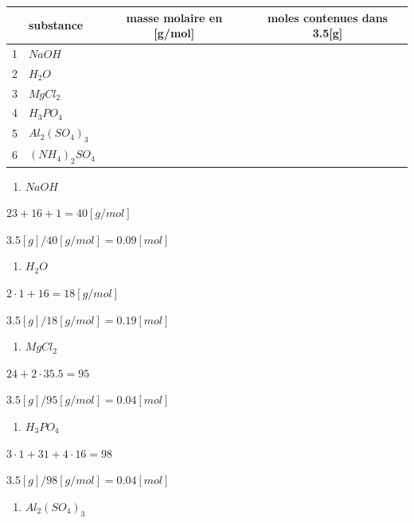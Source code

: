 \documentclass[
  11pt,
  french,
  a4paper,
  openany]{book}
\providecommand{\tightlist}{%
  \setlength{\itemsep}{0pt}\setlength{\parskip}{0pt}}
\begin{document}
\begin{longtable}[]{@{}clcc@{}}
\toprule
& substance & masse molaire en {[}g/mol{]} & moles contenues dans 3.5{[}g{]}\tabularnewline
\midrule
\endhead
1 & \(NaOH\) & &\tabularnewline
2 & \(H_2O\) & &\tabularnewline
3 & \(MgCl_2\) & &\tabularnewline
4 & \(H_3PO_4\) & &\tabularnewline
5 & \(Al_2(SO_4)_3\) & &\tabularnewline
6 & \((NH_4)_2SO_4\) & &\tabularnewline
\bottomrule
\end{longtable}

\begin{Answer}

\begin{multicols}{2}

\begin{enumerate}
\def\labelenumi{\arabic{enumi}.}
\tightlist
\item
  \(NaOH\)
\end{enumerate}

\(23 + 16 + 1 = 40 [g/mol]\)

\(3.5 [g] / 40 [g/mol] = 0.09 [mol]\)

\begin{enumerate}
\def\labelenumi{\arabic{enumi}.}
\setcounter{enumi}{1}
\tightlist
\item
  \(H_2O\)
\end{enumerate}

\(2 \cdot 1 + 16 = 18 [g/mol]\)

\(3.5 [g] / 18 [g/mol] = 0.19 [mol]\)

\begin{enumerate}
\def\labelenumi{\arabic{enumi}.}
\setcounter{enumi}{2}
\tightlist
\item
  \(MgCl_2\)
\end{enumerate}

\(24 + 2 \cdot 35.5 = 95\)

\(3.5 [g] / 95 [g/mol] = 0.04 [mol]\)

\begin{enumerate}
\def\labelenumi{\arabic{enumi}.}
\setcounter{enumi}{3}
\tightlist
\item
  \(H_3PO_4\)
\end{enumerate}

\(3 \cdot 1 + 31 + 4 \cdot 16 = 98\)

\(3.5 [g] / 98 [g/mol] = 0.04 [mol]\)

\begin{enumerate}
\def\labelenumi{\arabic{enumi}.}
\setcounter{enumi}{4}
\tightlist
\item
  \(Al_2(SO_4)_3\)
\end{enumerate}


\end{multicols}
\end{Answer}
\end{document}
